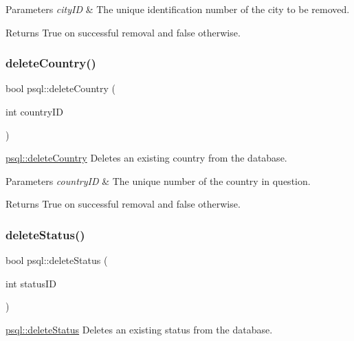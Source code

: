\begin{DoxyParams}{Parameters}
{\em city\+ID} & The unique identification number of the city to be removed. \\
\hline
\end{DoxyParams}
\begin{DoxyReturn}{Returns}
True on successful removal and false otherwise. 
\end{DoxyReturn}
\mbox{\label{classpsql_a914bf8701fbed4ff80edcd0d09c7c3fd}} 
\subsubsection{\texorpdfstring{delete\+Country()}{deleteCountry()}}
{\footnotesize\ttfamily bool psql\+::delete\+Country (\begin{DoxyParamCaption}\item[{int}]{country\+ID }\end{DoxyParamCaption})}



\mbox{\hyperlink{classpsql_a914bf8701fbed4ff80edcd0d09c7c3fd}{psql\+::delete\+Country}} Deletes an existing country from the database. 


\begin{DoxyParams}{Parameters}
{\em country\+ID} & The unique number of the country in question. \\
\hline
\end{DoxyParams}
\begin{DoxyReturn}{Returns}
True on successful removal and false otherwise. 
\end{DoxyReturn}
\mbox{\label{classpsql_a26fc592cfb9f484e1bee62af527f2b95}} 
\subsubsection{\texorpdfstring{delete\+Status()}{deleteStatus()}}
{\footnotesize\ttfamily bool psql\+::delete\+Status (\begin{DoxyParamCaption}\item[{int}]{status\+ID }\end{DoxyParamCaption})}



\mbox{\hyperlink{classpsql_a26fc592cfb9f484e1bee62af527f2b95}{psql\+::delete\+Status}} Deletes an existing status from the database. 


